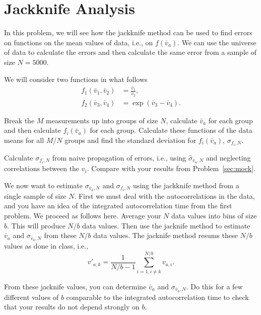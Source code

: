 \section{Jackknife Analysis}

In this problem, we will see how the jackknife method can be used to find errors on functions
on the mean values of data, i.e., on \(f(\bar{v}_a)\).
We can use the universe of data to calculate
the errors and then calculate the same error from a sample of size \(N = 5000\).

We will consider two functions in what follows
%
\begin{align}
    f_1(\bar{v}_1, \bar{v}_2) & = \frac{ \bar{v}_1 }{ \bar{v}_2 }, \\
    f_2(\bar{v}_3, \bar{v}_4) & = \exp( \bar{v}_3 - \bar{v}_4 ).
\end{align}

\Question{} Break the \(M\) measurements up into groups of size \(N\), calculate
\(\bar{v}_a\) for each group and then calculate \(f_i(\bar{v}_a)\) for each group.
Calculate these functions of the data means for all \(M/N\) groups and find the
standard deviation for \(f_i(\bar{v}_a)\), \(\sigma_{f_i,N}\).

\Answer{}





\Question{} Calculate \(\sigma_{f_i,N}\) from naive propagation of errors, i.e., using
\(\hat{\sigma}_{\bar{v}_a,N}\) and neglecting correlations between the \(v_i\). Compare with
your results from Problem~\ref{sec:mock}.

\Answer{}



\Question{} We now want to estimate \(\sigma_{\bar{v}_a,N}\) and \(\sigma_{f_i,N}\) using
the jackknife method from a single sample of size \(N\).
First we must deal with the autocorrelations in the data, and you have an idea of the
integrated autocorrelation time from the first problem. We proceed as follows here. Average
your \(N\) data values into bins of size \(b\). This will produce \(N/b\) data values.
Then use the jacknife method to estimate \(\bar{v}_a\) and \(\sigma_{\bar{v}_a,N}\) from
these \(N/b\) data values. The jacknife method resums these \(N/b\) values as done in class,
i.e.,
%
\begin{equation}
    v'_{a,k} = \frac{ 1 }{ N / b - 1 } \sum_{i=1, i \neq k}^{N/b} v_{a,i}.
\end{equation}

From these jacknife values, you can determine \(\bar{v}_a\) and \(\sigma_{\bar{v}_a,N}\).
Do this for a few different values of \(b\) comparable to the integrated autocorrelation
time to check that your results do not depend strongly on \(b\).

